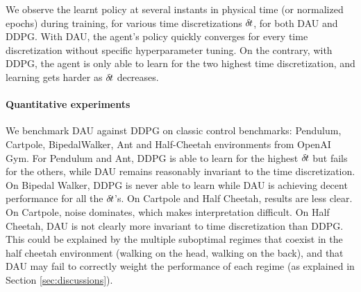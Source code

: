 We observe the learnt policy at several instants in physical time (or normalized epochs) during training, for various time discretizations ${\delta\hspace{-.1em}t}$, for both DAU and DDPG. With DAU, the agent's policy quickly converges for every time discretization without specific hyperparameter tuning. On the contrary, with DDPG, the agent is only able to learn for the two highest time discretization, and learning gets harder as ${\delta\hspace{-.1em}t}$ decreases.

\paragraph{Quantitative experiments}
We benchmark DAU against DDPG on classic control benchmarks: Pendulum, Cartpole, BipedalWalker, Ant and Half-Cheetah environments from OpenAI Gym. For Pendulum and Ant, DDPG is able to learn for the highest ${\delta\hspace{-.1em}t}$ but fails for the others, while DAU remains reasonably invariant to the time discretization. On Bipedal Walker, DDPG is never able to learn while DAU is achieving decent performance for all the ${\delta\hspace{-.1em}t}$'s. On Cartpole and Half Cheetah, results are less clear. On Cartpole, noise dominates, which makes interpretation difficult. On Half Cheetah, DAU is not clearly more invariant to time discretization than DDPG. This could be explained by the multiple suboptimal regimes that coexist in the half cheetah environment (walking on the head, walking on the back), and that DAU may fail to correctly weight the performance of each regime (as explained in Section \ref{sec:discussions}).


% 
